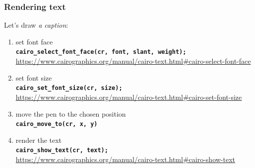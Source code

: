 \documentclass[aspectratio=169]{beamer}
\newcommand{\greenemph}[1]{\textit{\textcolor{clGreen}{#1}}}
\newcommand{\cppmethod}[1]{\texttt{\textbf{\textcolor{clCodeBlue}{#1}}}}
\begin{document}
\begin{frame}[fragile]
\frametitle{Rendering text}
{\large Let's draw \greenemph{a caption}:}
\vspace{3mm}
  \begin{enumerate}
    \item set font face\\
    \cppmethod{cairo\_select\_font\_face(cr, font, slant, weight);}\\
    \vspace{-5pt}
    {\tiny \url{https://www.cairographics.org/manual/cairo-text.html#cairo-select-font-face}}

    \item set font size\\
    \cppmethod{cairo\_set\_font\_size(cr, size);}\\
    \vspace{-5pt}
    {\tiny \url{https://www.cairographics.org/manual/cairo-text.html#cairo-set-font-size}}\\
    \vspace{-3pt}

    \item move the pen to the chosen position\\
    \cppmethod{cairo\_move\_to(cr, x, y)}\\

    \item render the text\\
    \cppmethod{cairo\_show\_text(cr, text);}\\
    \vspace{-5pt}
    {\tiny \url{https://www.cairographics.org/manual/cairo-text.html#cairo-show-text}}
  \end{enumerate}
\end{frame}
\end{document}

